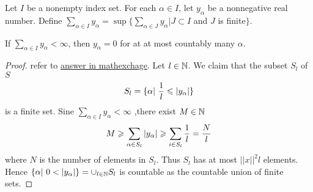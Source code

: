 \begin{definition}{}{}
    Let $I$ be a nonempty index set. For each $\alpha\in I$, let $y_{\alpha}$ be a nonnegative real number. 
    Define $\sum\limits_{\alpha\in I}^{}y_{\alpha} = \sup\{\sum\limits_{\alpha\in J}y_{\alpha}| J\subset I$ and $J$ is finite$\}$.  
\end{definition}

\begin{proposition}{}{}
    If $\sum\limits_{\alpha\in I}y_{\alpha} < \infty$, then $y_{\alpha}= 0$ for at at most countably many $\alpha$.
\end{proposition}

\begin{proof}
    refer to \href{https://math.stackexchange.com/questions/20661/the-sum-of-an-uncountable-number-of-positive-numbers}{answer in mathexchage}.
    Let $l\in\mathbb{N}$. We claim that the subset $S_l$ of $S$
    \begin{align*}
        S_l = \{\alpha|\ \frac{1}{l}\leqslant|y_{\alpha}|\}
    \end{align*}
    is a finite set. Sine $\sum\limits_{\alpha\in I}y_{\alpha} < \infty$ ,there exist $M\in \mathbb{N}$
    \begin{align*}
        M\geqslant \sum\limits_{\alpha\in S_l}|y_{\alpha}|\geqslant \sum\limits_{i\in S_l}\frac{1}{l} = \frac{N}{l}
    \end{align*}
    where $N$ is the number of elements in $S_l$. 
    Thus $S_l$ has at most $||x||^2l$  elements.\\
    Hence $\{\alpha|\  0< |y_{\alpha}|\}= \cup_{l\in\mathbb{N}}S_l$ is countable as the countable union of finite sets.
\end{proof}

